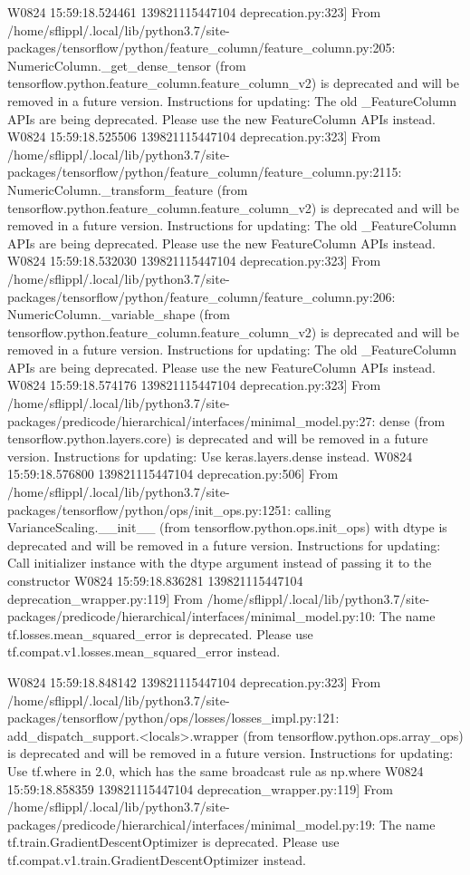 \documentclass[letterpaper,10pt,english]{sphinxmanual}
\begin{document}
{\begin{sphinxVerbatim}[commandchars=\\\{\}]
W0824 15:59:18.524461 139821115447104 deprecation.py:323] From /home/sflippl/.local/lib/python3.7/site-packages/tensorflow/python/feature\_column/feature\_column.py:205: NumericColumn.\_get\_dense\_tensor (from tensorflow.python.feature\_column.feature\_column\_v2) is deprecated and will be removed in a future version.
Instructions for updating:
The old \_FeatureColumn APIs are being deprecated. Please use the new FeatureColumn APIs instead.
W0824 15:59:18.525506 139821115447104 deprecation.py:323] From /home/sflippl/.local/lib/python3.7/site-packages/tensorflow/python/feature\_column/feature\_column.py:2115: NumericColumn.\_transform\_feature (from tensorflow.python.feature\_column.feature\_column\_v2) is deprecated and will be removed in a future version.
Instructions for updating:
The old \_FeatureColumn APIs are being deprecated. Please use the new FeatureColumn APIs instead.
W0824 15:59:18.532030 139821115447104 deprecation.py:323] From /home/sflippl/.local/lib/python3.7/site-packages/tensorflow/python/feature\_column/feature\_column.py:206: NumericColumn.\_variable\_shape (from tensorflow.python.feature\_column.feature\_column\_v2) is deprecated and will be removed in a future version.
Instructions for updating:
The old \_FeatureColumn APIs are being deprecated. Please use the new FeatureColumn APIs instead.
W0824 15:59:18.574176 139821115447104 deprecation.py:323] From /home/sflippl/.local/lib/python3.7/site-packages/predicode/hierarchical/interfaces/minimal\_model.py:27: dense (from tensorflow.python.layers.core) is deprecated and will be removed in a future version.
Instructions for updating:
Use keras.layers.dense instead.
W0824 15:59:18.576800 139821115447104 deprecation.py:506] From /home/sflippl/.local/lib/python3.7/site-packages/tensorflow/python/ops/init\_ops.py:1251: calling VarianceScaling.\_\_init\_\_ (from tensorflow.python.ops.init\_ops) with dtype is deprecated and will be removed in a future version.
Instructions for updating:
Call initializer instance with the dtype argument instead of passing it to the constructor
W0824 15:59:18.836281 139821115447104 deprecation\_wrapper.py:119] From /home/sflippl/.local/lib/python3.7/site-packages/predicode/hierarchical/interfaces/minimal\_model.py:10: The name tf.losses.mean\_squared\_error is deprecated. Please use tf.compat.v1.losses.mean\_squared\_error instead.

W0824 15:59:18.848142 139821115447104 deprecation.py:323] From /home/sflippl/.local/lib/python3.7/site-packages/tensorflow/python/ops/losses/losses\_impl.py:121: add\_dispatch\_support.<locals>.wrapper (from tensorflow.python.ops.array\_ops) is deprecated and will be removed in a future version.
Instructions for updating:
Use tf.where in 2.0, which has the same broadcast rule as np.where
W0824 15:59:18.858359 139821115447104 deprecation\_wrapper.py:119] From /home/sflippl/.local/lib/python3.7/site-packages/predicode/hierarchical/interfaces/minimal\_model.py:19: The name tf.train.GradientDescentOptimizer is deprecated. Please use tf.compat.v1.train.GradientDescentOptimizer instead.


\end{sphinxVerbatim}}
\end{document}
